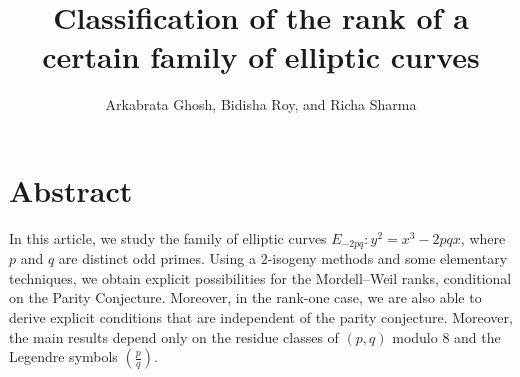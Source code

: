 \documentclass[12pt]{amsart}
\newcommand{\legendre}[2]{\genfrac{(}{)}{}{}{#1}{#2}}
\numberwithin{equation}{section}
\theoremstyle{definition}
\begin{document}
\title{Classification of the rank of a certain family of elliptic curves}

\author{ Arkabrata Ghosh, Bidisha Roy, and Richa Sharma }



\address[Arkabrata Ghosh]{ Department of Mathematics, SRM University-AP, Amaravati 522240, Andhra Pradesh, India}


\address[Bidisha Roy]{Department of Mathematics and Statistics, Indian Institute of Technology Tirupati, Yerpedu, Andhra Pradesh 517619, India}

 \address[Richa Sharma]{Department of Mathematics, Jamia Milia Islamia University, New Delhi}







\maketitle


\section*{Abstract}
In this article, we study the family of elliptic curves
$E_{-2pq}: y^2=x^3-2pqx$, where $p$ and $q$ are distinct odd primes.
Using a $2$-isogeny methods and some elementary techniques, we obtain explicit possibilities for the Mordell--Weil ranks, conditional on the Parity Conjecture. Moreover, in the rank-one case, we are also able to derive explicit conditions that are independent of the parity conjecture. Moreover, the main results depend only on the residue classes of $(p,q)$ modulo $8$ and the Legendre symbols $\legendre{p}{q}$.  

\end{document}
